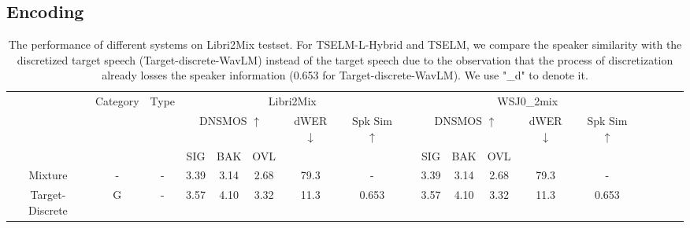 \documentclass[conference]{IEEEtran}
\begin{document}
\subsection{Encoding}


\begin{table}
  \caption{The performance of different systems on Libri2Mix testset. For TSELM-L-Hybrid  
  and TSELM, we compare the speaker similarity with the discretized target speech 
  (Target-discrete-WavLM) instead of the target speech due to the observation that 
  the process of discretization already losses the speaker information (0.653 for 
  Target-discrete-WavLM). We use "\_d" to denote it. }
  \renewcommand{\arraystretch}{1.2}
  \begin{center}
  \begin{tabular}{cccccccccccccccccc}
    \Xhline{2\arrayrulewidth} %
  \multirow{3}{*}{System} & \multicolumn{1}{l}{\multirow{3}{*}{Category}} & \multicolumn{1}{l}{\multirow{3}{*}{Type}} &  \multicolumn{5}{c}{Libri2Mix}                    &                               & \multicolumn{5}{c}{WSJ0\_2mix}                                                  \\
  \cline{4-8} \cline{10-14}
                          & \multicolumn{1}{l}{}                                                 & \multicolumn{1}{l}{}                            & \multicolumn{3}{c}{DNSMOS $\uparrow$} & dWER $\downarrow$ & Spk Sim $\uparrow$ &  & \multicolumn{3}{c}{DNSMOS $\uparrow$} & dWER $\downarrow$ & Spk Sim $\uparrow$  \\ \cline{4-6} \cline{10-12}
                          & \multicolumn{1}{l}{}                                                    & \multicolumn{1}{l}{}                            & SIG         & BAK        & OVL        &                   &        &             & SIG         & BAK        & OVL        &                   &                    \\ \hline
  Mixture                 & -                                             & -                                                                                           & 3.39        & 3.14       & 2.68       & 79.3            & -        &           & 3.39        & 3.14       & 2.68       & 79.3            & -                  \\
  Target-Discrete         & G                                             & -                                                                                          & 3.57        & 4.10       & 3.32       & 11.3            & 0.653     &          & 3.57        & 4.10       & 3.32       & 11.3            & 0.653               \\ \hline

\end{tabular}
\end{center}
\end{table}
\end{document}
